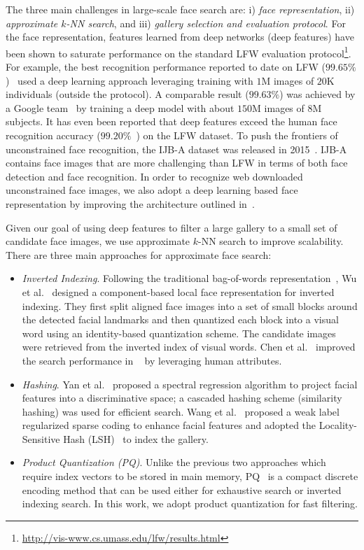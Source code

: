 \documentclass[10pt,journal,compsoc]{IEEEtran}
\begin{document}
The three main challenges in large-scale face search are: i) \emph{face representation}, ii) \emph{approximate $k$-NN search}, and iii) \emph{gallery selection and evaluation protocol}. For the face representation, features learned from deep networks (deep features) have been shown to saturate performance on the standard LFW evaluation protocol\footnote{\url{http://vis-www.cs.umass.edu/lfw/results.html}}.
For example, the best recognition performance reported to date on LFW ($99.65\%$)~\cite{dl:tencent} used a deep learning approach leveraging training with $1$M images of $20$K individuals (outside the protocol). A comparable result ($99.63\%$) was achieved by a Google team~\cite{dl:facenet} by training a deep model with about $150$M images of $8$M subjects. It has even been reported that deep features exceed the human face recognition accuracy ($99.20\%$~\cite{CAVE_0296}) on the LFW dataset. To push the frontiers of unconstrained face recognition, the IJB-A dataset was released in 2015~\cite{db:janus}. IJB-A contains face images that are more challenging than LFW in terms of both face detection and face recognition. In order to recognize web downloaded unconstrained face images, we also adopt a deep learning based face representation by improving the architecture outlined in~\cite{DB:CASIA}.

Given our goal of using deep features to filter a large gallery to a small set of candidate face images, we use approximate $k$-NN search to improve scalability. There are three main approaches for approximate face search:
\begin{itemize}
  \item \emph{Inverted Indexing}. Following the traditional bag-of-words representation~\cite{cbir}, Wu et al.~\cite{faceretrieval:wu2010} designed a component-based local face representation for inverted indexing. They first split aligned face images into a set of small blocks around the detected facial landmarks and then quantized each block into a visual word using an identity-based quantization scheme. The candidate images were retrieved from the inverted index of visual words. Chen et al.~\cite{faceretrieval:chen2012} improved the search performance in ~\cite{faceretrieval:wu2010} by leveraging human attributes.
  \item \emph{Hashing}. Yan et al.~\cite{fr:sh} proposed a spectral regression algorithm to project facial features into a discriminative space; a cascaded hashing scheme (similarity hashing) was used for efficient search. Wang et al.~\cite{SELF:TPAMI:WLRLCC} proposed a weak label regularized sparse coding to enhance facial features and adopted the Locality-Sensitive Hash (LSH)~\cite{retrieval:LSH} to index the gallery.
  \item \emph{Product Quantization (PQ)}. Unlike the previous two approaches which require index vectors to be stored in main memory, PQ~\cite{retrieval:pq} is a compact discrete encoding method that can be used either for exhaustive search or inverted indexing search. In this work, we adopt product quantization for fast filtering.
\end{itemize}
\end{document}
